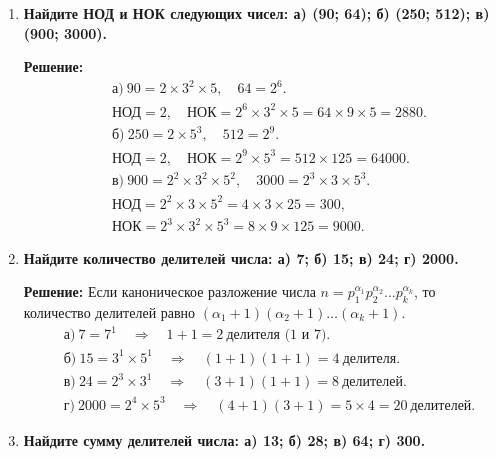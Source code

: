 \documentclass[12pt, a4paper]{article}
\begin{document}
\begin{enumerate}[label=\arabic*., wide=0pt, leftmargin=*]
\item \textbf{Найдите НОД и НОК следующих чисел: а) (90; 64); б) (250; 512); в) (900; 3000).}

\textbf{Решение:}
\[
\begin{aligned}
&\text{а)}\ 90 = 2 \times 3^2 \times 5,\quad 64 = 2^6.\\
&\text{НОД} = 2,\quad \text{НОК} = 2^6 \times 3^2 \times 5 = 64 \times 9 \times 5 = 2880.\\[4pt]
&\text{б)}\ 250 = 2 \times 5^3,\quad 512 = 2^9.\\
&\text{НОД} = 2,\quad \text{НОК} = 2^9 \times 5^3 = 512 \times 125 = 64000.\\[4pt]
&\text{в)}\ 900 = 2^2 \times 3^2 \times 5^2,\quad 3000 = 2^3 \times 3 \times 5^3.\\
&\text{НОД} = 2^2 \times 3 \times 5^2 = 4 \times 3 \times 25 = 300,\\
&\text{НОК} = 2^3 \times 3^2 \times 5^3 = 8 \times 9 \times 125 = 9000.
\end{aligned}
\]

\item \textbf{Найдите количество делителей числа: а) 7; б) 15; в) 24; г) 2000.}

\textbf{Решение:} 
Если каноническое разложение числа $n = p_1^{\alpha_1} p_2^{\alpha_2} \dots p_k^{\alpha_k}$, то количество делителей равно $(\alpha_1+1)(\alpha_2+1)\dots(\alpha_k+1)$.
\[
\begin{aligned}
&\text{а)}\ 7 = 7^1 \quad\Rightarrow\quad 1+1 = 2\ \text{делителя (1 и 7)}.\\
&\text{б)}\ 15 = 3^1 \times 5^1 \quad\Rightarrow\quad (1+1)(1+1) = 4\ \text{делителя}.\\
&\text{в)}\ 24 = 2^3 \times 3^1 \quad\Rightarrow\quad (3+1)(1+1) = 8\ \text{делителей}.\\
&\text{г)}\ 2000 = 2^4 \times 5^3 \quad\Rightarrow\quad (4+1)(3+1) = 5 \times 4 = 20\ \text{делителей}.
\end{aligned}
\]

\item \textbf{Найдите сумму делителей числа: а) 13; б) 28; в) 64; г) 300.}


\end{enumerate}
\end{document}
